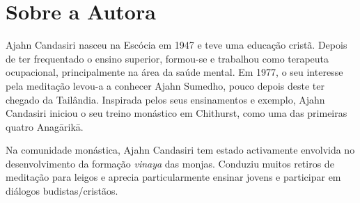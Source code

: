\chapter{Sobre a Autora}

Ajahn Candasiri nasceu na Escócia em 1947 e teve uma educação cristã.
Depois de ter frequentado o ensino superior, formou-se e trabalhou como
terapeuta ocupacional, principalmente na área da saúde mental. Em 1977,
o seu interesse pela meditação \mbox{levou-a} a conhecer Ajahn Sumedho, pouco
depois deste ter chegado da Tailândia. Inspirada pelos seus ensinamentos
e exemplo, Ajahn Candasiri iniciou o seu treino monástico em Chithurst,
como uma das primeiras quatro Anagārikā.

Na comunidade monástica, Ajahn Candasiri tem estado activamente
envolvida no desenvolvimento da formação \emph{vinaya} das monjas.
Conduziu muitos retiros de meditação para leigos e aprecia
particularmente ensinar jovens e participar em diálogos
budistas/cristãos.
